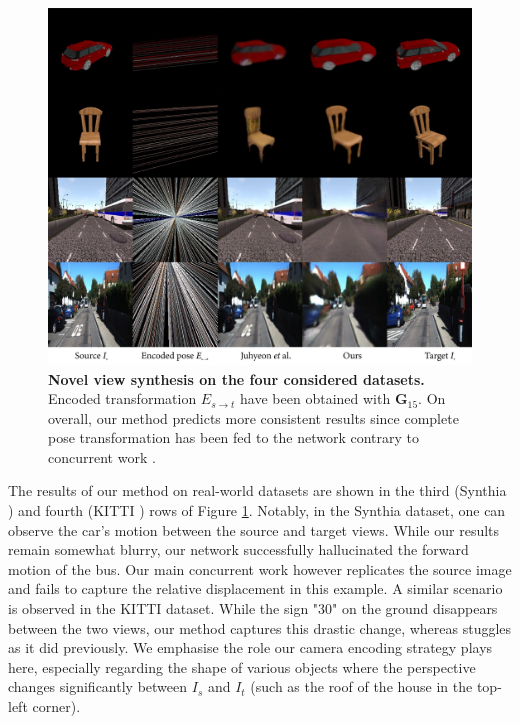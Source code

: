 \begin{figure}[h!]
    \begin{center}
    \includegraphics[width=\textwidth]{images/epipolarnvs/resultsFinal_BMVC_New.png}
    \end{center}
     \caption{\textbf{Novel view synthesis on the four considered datasets.} Encoded transformation $E_{s\xrightarrow{}t}$ have been obtained with $\textbf{G}_{15}$. On overall, our method predicts more consistent results since complete pose transformation has been fed to the network contrary to concurrent work \citep{kim2020novel}.}
     \label{fig:res_all}
\end{figure}

The results of our method on real-world datasets are shown in the third (Synthia \citep{ros2016synthia}) and fourth (KITTI \citep{geiger2012we}) rows of Figure \ref{fig:res_all}. Notably, in the Synthia \citep{ros2016synthia} dataset, one can observe the car’s motion between the source and target views. While our results remain somewhat blurry, our network successfully hallucinated the forward motion of the bus. Our main concurrent work however replicates the source image and fails to capture the relative displacement in this example. A similar scenario is observed in the KITTI \citep{geiger2012we} dataset. While the sign "30" on the ground disappears between the two views, our method captures this drastic change,  whereas \citep{kim2020novel} stuggles as it did previously. We emphasise the role our camera encoding strategy plays here, especially regarding the shape of various objects where the perspective changes significantly between $I_s$ and $I_t$ (such as the roof of the house in the top-left corner). \newline


